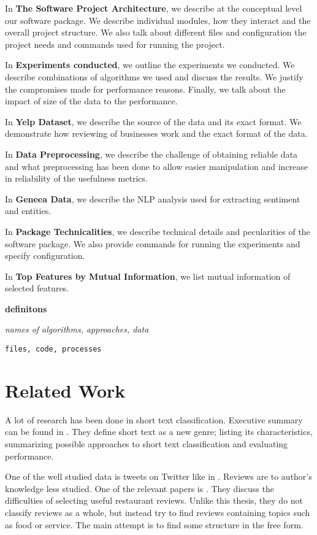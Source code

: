 In \textbf{ The Software Project Architecture}, we describe at the conceptual level our software package.
We describe individual modules, how they interact and the overall project structure.
We also talk about different files and configuration the project needs and commands used for running the project.

In \textbf{ Experiments conducted}, we outline the experiments we conducted.
We describe combinations of algorithms we used and discuss the results.
We justify the compromises made for performance reasons.
Finally, we talk about the impact of size of the data to the performance.

In \textbf{ Yelp Dataset},
we describe the source of the data and its exact format.
We demonstrate how reviewing of businesses work and
the exact format of the data.

In \textbf{ Data Preprocessing},
we describe the challenge of obtaining reliable data and
what preprocessing has been done to allow easier manipulation and increase in reliability of the usefulness metrics.

In \textbf{ Geneea Data},
we describe the NLP analysis used for extracting sentiment and entities.

In \textbf{ Package Technicalities},
we describe technical details and pecularities of the software package.
We also provide commands for running the experiments and specify configuration.

In \textbf{ Top Features by Mutual Information},
we list mutual information of selected features.




{\bf definitons}

{\it names of algorithms, approaches, data}

\texttt{files, code, processes}


\section{Related Work}

A lot of research has been done in short text classification.
Executive summary can be found in \citet{Song14}.
They define short text as a new genre; listing its characteristics, summarizing possible approaches to short text classification and evaluating performance.

One of the well studied data is tweets on Twitter like in \citep{sriram2010short}.
Reviews are to author's knowledge less studied.
One of the relevant papers is \citet{ganu2009beyond}.
They discuss the difficulties of selecting useful restaurant reviews.
Unlike this thesis, they do not classify reviews as a whole, but instead try to find reviews containing topics such as food or service.
The main attempt is to find some structure in the free form.

